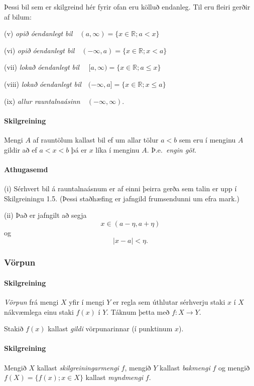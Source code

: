 \documentclass[icelandic,a4paper,12pt]{article}
\newcommand{\R}{{\mathbb  R}}
\begin{document}
\medskip

Þessi bil sem er skilgreind hér fyrir ofan eru kölluð endanleg.  Til
eru fleiri gerðir af bilum:


(v)  {\em opið óendanlegt bil}\ \    $(a,\infty)=\{x\in \R ; a<x\}$

(vi)  {\em opið óendanlegt bil}\ \    $(-\infty, a)=\{x\in \R ; x<a\}$

(vii)  {\em lokað óendanlegt bil} \ \ $[a,\infty)=\{x\in \R ; a\leq x\}$

(viii)  {\em lokað óendanlegt bil}\ \  $(-\infty, a]=\{x\in \R ; x\leq a\}$

(ix)  {\em allur rauntalnaásinn}\ \  $(-\infty, \infty)$.




\paragraph{Skilgreining} Mengi $A$ af rauntölum kallast bil ef um
allar tölur $a<b$ sem eru í menginu $A$ gildir að ef $a<x<b$ þá er $x$
líka í menginu $A$. \pause Þ.e.~\emph{engin göt}.


\pause

\paragraph{Athugasemd}  

(i) Sérhvert bil á rauntalnaásnum er af
einni þeirra gerða sem talin er upp í Skilgreiningu 1.5.   (Þessi
staðhæfing er jafngild frumsendunni um efra mark.)

\pause

(ii) Það er jafngilt að segja 
$$x \in (a-\eta,a+\eta)$$ 
og 
$$|x-a| < \eta.$$



\subsubsection*{Vörpun}
\paragraph{Skilgreining}
\emph{Vörpun} frá mengi $X$ yfir í mengi $Y$ er regla sem úthlutar sérhverju
staki $x$ í $X$ nákvæmlega einu staki $f(x)$ í $Y$. Táknum þetta með
$f:X \to Y$. 

Stakið $f(x)$ kallast \emph{gildi} vörpunarinnar (í punktinum $x$).


\pause

\paragraph{Skilgreining}
Mengið $X$ kallast \emph{skilgreiningarmengi} $f$, 
mengið $Y$ kallast \emph{bakmengi} $f$ og 
mengið $f(X) = \{ f(x); x \in X \}$ kallast \emph{myndmengi} $f$.
\end{document}
